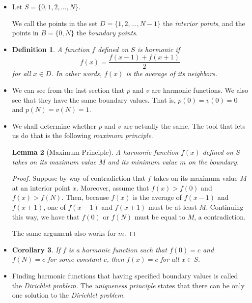 \documentclass[10pt]{article}
\newtheorem{lemma}{Lemma}[section]
\newtheorem{definition}[lemma]{Definition}
\newtheorem{corollary}[lemma]{Corollary}
\begin{document}
\begin{itemize}
	\item Let $S = \{0, 1, 2, \dotsc, N\}$. 
		
		We call the points in the set $D = \{1, 2, \dotsc, N-1\}$ 
		the \emph{interior points}, and the points in 
		$B = \{0, N\}$ the \emph{boundary points}.
		
	\item \begin{definition}
		A function $f$ defined on $S$ is \emph{harmonic} if
		$$f(x) = \frac{f(x-1) + f(x+1)}{2}$$ for all $x \in D$.
		In other words, $f(x)$ is the average of its neighbors.
	\end{definition}
	
	\item We can see from the last section that $p$ and $v$
		are harmonic functions. We also see that they have
		the same boundary values. That is, $p(0) = v(0) = 0$
		and $p(N) = v(N) = 1.$
		
	\item We shall determine whether $p$ and $v$ are actually
		the same. The tool that lets us do that is the following
		\emph{maximum principle}.
		
		\begin{lemma}[Maximum Principle]
			A harmonic function $f(x)$ defined on $S$ takes
			on its maximum value $M$ and its minimum value $m$
			on the boundary.
		\end{lemma}
		
		\begin{proof}
			Suppose by way of contradiction that $f$
			takes on its maximum value $M$ at an interior point
			$x$. Moreover, assume that $f(x) > f(0)$ and 
			$f(x) > f(N).$ Then, because $f(x)$ is the average
			of $f(x-1)$ and $f(x+1)$, one of $f(x-1)$ and
			$f(x+1)$ must be at least $M$. Continuing this way,
			we have that $f(0)$ or $f(N)$ must be equal to $M$,
			a contradiction.
			
			The same argument also works for $m$.
		\end{proof}
		
	\item \begin{corollary} \label{constant-harmonic-function}
		If $f$ is a harmonic function such that $f(0) = c$
		and $f(N) = c$ for some constant $c$, then $f(x) = c$
		for all $x \in S.$
	\end{corollary}
	
	\item Finding harmonic functions that having specified boundary
		values is called the \emph{Dirichlet problem.} The 
		\emph{uniqueness principle} states that there can be
		only one solution to the \emph{Dirichlet problem}.
		

\end{itemize}
\end{document}
